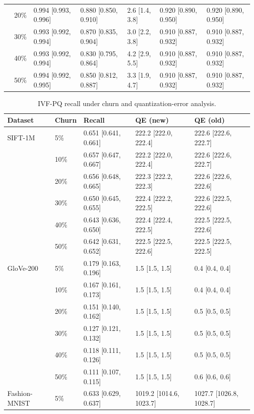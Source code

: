 \documentclass{ieeeaccess}
\begin{document}
\begin{table}[t]
\begin{tabular}{lllllll}
 & 20\% & 0.994 [0.993, 0.996] & 0.880 [0.850, 0.910] & 2.6 [1.4, 3.8] & 0.920 [0.890, 0.950] & 0.920 [0.890, 0.950] \\
 & 30\% & 0.993 [0.992, 0.994] & 0.870 [0.835, 0.904] & 3.0 [2.2, 3.8] & 0.910 [0.887, 0.932] & 0.910 [0.887, 0.932] \\
 & 40\% & 0.993 [0.992, 0.994] & 0.830 [0.795, 0.864] & 4.2 [2.9, 5.5] & 0.910 [0.887, 0.932] & 0.910 [0.887, 0.932] \\
 & 50\% & 0.994 [0.992, 0.995] & 0.850 [0.812, 0.887] & 3.3 [1.9, 4.7] & 0.910 [0.887, 0.932] & 0.910 [0.887, 0.932] \\
\midrule
\bottomrule
\end{tabular}
\end{table}

\begin{table}[t]
\centering
\caption{IVF-PQ recall under churn and quantization-error analysis.}
\label{tab:ivfpq}
\begin{tabular}{lllll}
\toprule
Dataset & Churn & Recall & QE (new) & QE (old) \\
\midrule
SIFT-1M & 5\% & 0.651 [0.641, 0.661] & 222.2 [222.0, 222.4] & 222.6 [222.6, 222.7] \\
 & 10\% & 0.657 [0.647, 0.667] & 222.2 [222.0, 222.4] & 222.6 [222.6, 222.7] \\
 & 20\% & 0.656 [0.648, 0.665] & 222.3 [222.2, 222.3] & 222.6 [222.6, 222.6] \\
 & 30\% & 0.650 [0.645, 0.655] & 222.4 [222.2, 222.5] & 222.6 [222.5, 222.6] \\
 & 40\% & 0.643 [0.636, 0.650] & 222.4 [222.4, 222.5] & 222.5 [222.5, 222.6] \\
 & 50\% & 0.642 [0.631, 0.652] & 222.5 [222.5, 222.6] & 222.5 [222.5, 222.5] \\
\midrule
GloVe-200 & 5\% & 0.179 [0.163, 0.196] & 1.5 [1.5, 1.5] & 0.4 [0.4, 0.4] \\
 & 10\% & 0.167 [0.161, 0.173] & 1.5 [1.5, 1.5] & 0.4 [0.4, 0.4] \\
 & 20\% & 0.151 [0.140, 0.162] & 1.5 [1.5, 1.5] & 0.5 [0.5, 0.5] \\
 & 30\% & 0.127 [0.121, 0.132] & 1.5 [1.5, 1.5] & 0.5 [0.5, 0.5] \\
 & 40\% & 0.118 [0.111, 0.126] & 1.5 [1.5, 1.5] & 0.5 [0.5, 0.5] \\
 & 50\% & 0.111 [0.107, 0.115] & 1.5 [1.5, 1.5] & 0.6 [0.6, 0.6] \\
\midrule
Fashion-MNIST & 5\% & 0.633 [0.629, 0.637] & 1019.2 [1014.6, 1023.7] & 1027.7 [1026.8, 1028.7] \\

\end{tabular}
\end{table}
\end{document}
